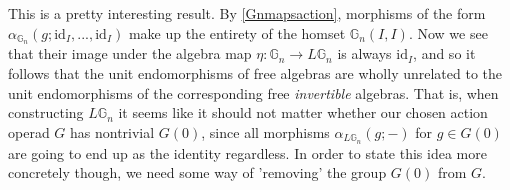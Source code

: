This is a pretty interesting result. By \cref{Gnmapsaction}, morphisms of the form $\alpha_{\mathbb{G}_n}(g; \mathrm{id}_I, ..., \mathrm{id}_I)$ make up the entirety of the homset $\mathbb{G}_n(I,I)$. Now we see that their image under the algebra map $\eta: \mathbb{G}_n \to L\mathbb{G}_n$ is always $\mathrm{id}_I$, and so it follows that the unit endomorphisms of free algebras are wholly unrelated to the unit endomorphisms of the corresponding free \emph{invertible} algebras. That is, when constructing $L\mathbb{G}_n$ it seems like it should not matter whether our chosen action operad $G$ has nontrivial $G(0)$, since all morphisms $\alpha_{L\mathbb{G}_n}(g; - )$ for $g \in G(0)$ are going to end up as the identity regardless. In order to state this idea more concretely though, we need some way of 'removing' the group $G(0)$ from $G$.

